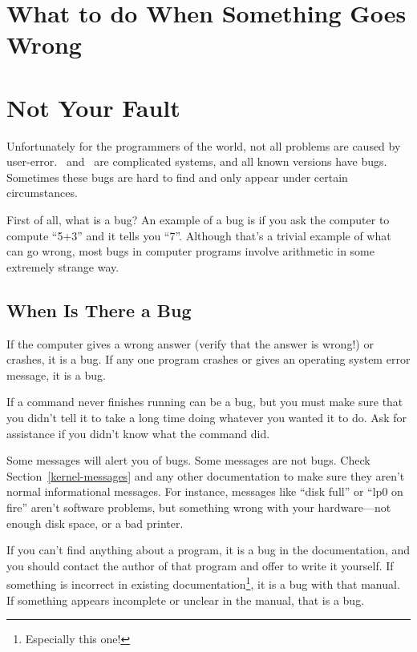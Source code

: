 \section{What to do When Something Goes Wrong}



\section{Not Your Fault}

Unfortunately for the programmers of the world, not all problems are
caused by user-error. \unix\ and \linux\ are complicated systems, and
all known versions have bugs.  Sometimes these bugs are hard to find
and only appear under certain circumstances.  

First of all, what is a bug?  An example of a bug is if you ask the
computer to compute ``5+3'' and it tells you ``7''. Although that's a
trivial example of what can go wrong, most bugs in computer programs
involve arithmetic in some extremely strange way. 

\subsection{When Is There a Bug}

If the computer gives a wrong answer (verify that the answer is
wrong!) or crashes, it is a bug. If any one program crashes or gives
an operating system error message, it is a bug.

If a command never finishes running can be a bug, but you must make
sure that you didn't tell it to take a long time doing whatever you
wanted it to do.  Ask for assistance if you didn't know what the
command did.

Some messages will alert you of bugs.  Some messages are not bugs.
Check Section~\ref{kernel-messages} and any other documentation to
make sure they aren't normal informational messages.  For instance,
messages like ``disk full'' or ``lp0 on fire'' aren't software
problems, but something wrong with your hardware---not enough disk
space, or a bad printer.

If you can't find anything about a program, it is a bug in the
documentation, and you should contact the author of that program and
offer to write it yourself. If something is incorrect in existing
documentation\footnote{Especially this one!}, it is a bug with that
manual. If something appears incomplete or unclear in the manual, that
is a bug.

